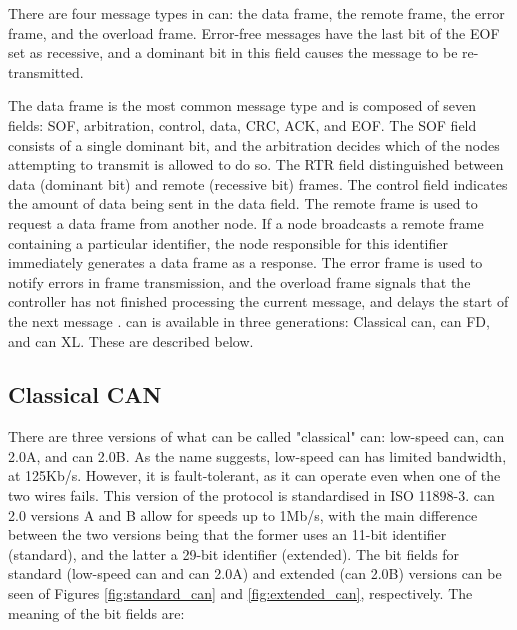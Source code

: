 There are four message types in \gls{can}: the data frame, the remote frame, the error frame, and the overload frame. Error-free messages have the last bit of the EOF set as recessive, and a dominant bit in this field causes the message to be re-transmitted.\par

The data frame is the most common message type and is composed of seven fields: SOF, arbitration, control, data, CRC, ACK, and EOF. The SOF field consists of a single dominant bit, and the arbitration decides which of the nodes attempting to transmit is allowed to do so. The RTR field distinguished between data (dominant bit) and remote (recessive bit) frames. The control field indicates the amount of data being sent in the data field. The remote frame is used to request a data frame from another node. If a node broadcasts a remote frame containing a particular identifier, the node responsible for this identifier immediately generates a data frame as a response. The error frame is used to notify errors in frame transmission, and the overload frame signals that the controller has not finished processing the current message, and delays the start of the next message \citep{lee2017otids}.
\gls{can} is available in three generations: Classical \gls{can}, \gls{can} FD, and \gls{can} XL. These are described below.

\subsection{Classical CAN}

There are three versions of what can be called "classical" \gls{can}: low-speed \gls{can}, \gls{can} 2.0A, and \gls{can} 2.0B. As the name suggests, low-speed \gls{can} has limited bandwidth, at 125Kb/s. However, it is fault-tolerant, as it can operate even when one of the two wires fails. This version of the protocol is standardised in ISO 11898-3. \gls{can} 2.0 versions A and B allow for speeds up to 1Mb/s, with the main difference between the two versions being that the former uses an 11-bit identifier (standard), and the latter a 29-bit identifier (extended). The bit fields for standard (low-speed \gls{can} and \gls{can} 2.0A) and extended (\gls{can} 2.0B) versions can be seen of Figures \ref{fig:standard_can} and \ref{fig:extended_can}, respectively. The meaning of the bit fields are:

